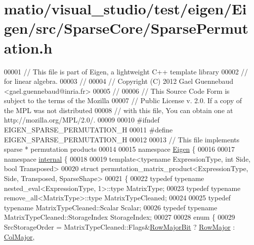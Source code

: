 \hypertarget{matio_2visual__studio_2test_2eigen_2_eigen_2src_2_sparse_core_2_sparse_permutation_8h_source}{}\section{matio/visual\+\_\+studio/test/eigen/\+Eigen/src/\+Sparse\+Core/\+Sparse\+Permutation.h}
\label{matio_2visual__studio_2test_2eigen_2_eigen_2src_2_sparse_core_2_sparse_permutation_8h_source}

\begin{DoxyCode}
00001 \textcolor{comment}{// This file is part of Eigen, a lightweight C++ template library}
00002 \textcolor{comment}{// for linear algebra.}
00003 \textcolor{comment}{//}
00004 \textcolor{comment}{// Copyright (C) 2012 Gael Guennebaud <gael.guennebaud@inria.fr>}
00005 \textcolor{comment}{//}
00006 \textcolor{comment}{// This Source Code Form is subject to the terms of the Mozilla}
00007 \textcolor{comment}{// Public License v. 2.0. If a copy of the MPL was not distributed}
00008 \textcolor{comment}{// with this file, You can obtain one at http://mozilla.org/MPL/2.0/.}
00009 
00010 \textcolor{preprocessor}{#ifndef EIGEN\_SPARSE\_PERMUTATION\_H}
00011 \textcolor{preprocessor}{#define EIGEN\_SPARSE\_PERMUTATION\_H}
00012 
00013 \textcolor{comment}{// This file implements sparse * permutation products}
00014 
00015 \textcolor{keyword}{namespace }\hyperlink{namespace_eigen}{Eigen} \{ 
00016 
00017 \textcolor{keyword}{namespace }\hyperlink{namespaceinternal}{internal} \{
00018 
00019 \textcolor{keyword}{template}<\textcolor{keyword}{typename} ExpressionType, \textcolor{keywordtype}{int} S\textcolor{keywordtype}{id}e, \textcolor{keywordtype}{bool} Transposed>
00020 \textcolor{keyword}{struct }permutation\_matrix\_product<ExpressionType, Side, Transposed, SparseShape>
00021 \{
00022     \textcolor{keyword}{typedef} \textcolor{keyword}{typename} nested\_eval<ExpressionType, 1>::type MatrixType;
00023     \textcolor{keyword}{typedef} \textcolor{keyword}{typename} remove\_all<MatrixType>::type MatrixTypeCleaned;
00024 
00025     \textcolor{keyword}{typedef} \textcolor{keyword}{typename} MatrixTypeCleaned::Scalar Scalar;
00026     \textcolor{keyword}{typedef} \textcolor{keyword}{typename} MatrixTypeCleaned::StorageIndex StorageIndex;
00027 
00028     \textcolor{keyword}{enum} \{
00029       SrcStorageOrder = MatrixTypeCleaned::Flags&\hyperlink{group__flags_gae4f56c2a60bbe4bd2e44c5b19cbe8762}{RowMajorBit} ? 
      \hyperlink{group__enums_ggaacded1a18ae58b0f554751f6cdf9eb13acfcde9cd8677c5f7caf6bd603666aae3}{RowMajor} : \hyperlink{group__enums_ggaacded1a18ae58b0f554751f6cdf9eb13a0cbd4bdd0abcfc0224c5fcb5e4f6669a}{ColMajor},

\end{DoxyCode}
